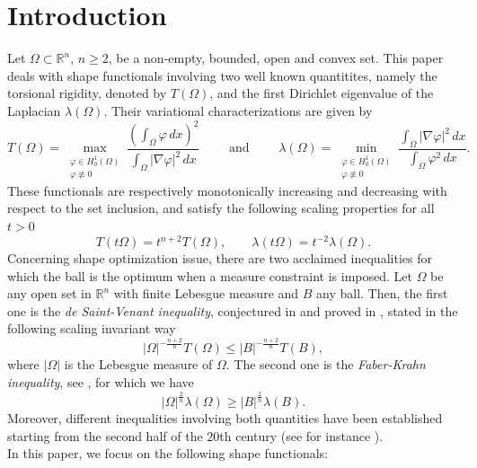 \documentclass[oneside,a4paper,11pt,notitlepage]{article}
\newcommand{\abs}[1]{{\left|#1\right|}}
\theoremstyle{definition}
\theoremstyle{plain}
\theoremstyle{definition}
\begin{document}
\section{Introduction}
Let $\Omega\subset\mathbb{R}^n$, $n\geq 2$, be a non-empty, bounded, open and convex set. This paper deals with shape functionals involving two well known quantitites, namely the torsional rigidity, denoted by $T(\Omega)$, and the first Dirichlet eigenvalue of the Laplacian $\lambda(\Omega)$. Their variational characterizations are given by
$$
T(\Omega) = \max_{\substack{\varphi \in H^1_0(\Omega) \\ \varphi \not\equiv 0}} \frac{\left(\displaystyle{\int_\Omega \varphi \, dx }\right)^2}{\displaystyle{\int_\Omega \abs{\nabla \varphi}^2 \, dx }} \qquad \text{ and }\qquad\lambda(\Omega)= \min_{\substack{\varphi \in H^1_0(\Omega) \\ \varphi \not\equiv 0}} \frac{\displaystyle{\int_\Omega  \abs{\nabla \varphi}^2 \, dx }}{\displaystyle{\int_\Omega  \varphi^2 \, dx }} .
$$
These functionals are respectively monotonically increasing and decreasing with respect to the set inclusion, and satisfy the following scaling properties for all $t>0$
\begin{equation*}
T(t\Omega)= t^{n+2}T(\Omega),\qquad \lambda(t\Omega)= t^{-2}\lambda(\Omega).
\end{equation*}
Concerning shape optimization issue, there are two acclaimed inequalities for which the ball is the optimum when a measure constraint is imposed. Let $\Omega$ be any open set in $\mathbb R^n$ with finite Lebesgue measure and $B$ any ball. Then, the first one is the \textit{de Saint-Venant inequality}, conjectured in \cite{stvenant} and proved in \cite{PTR48}, stated in the following scaling invariant way
\begin{equation*}
    \abs{\Omega}^{-\frac{n+2}{n}}T(\Omega) \le \abs{B}^{-\frac{n+2}{n}}T(B),
\end{equation*}
where $\abs{\Omega}$ is the Lebesgue measure of $\Omega$. The second one is the \textit{Faber-Krahn inequality}, see  \cite{Faber1923,Krahn1925}, for which we have
\begin{equation*}
    \abs{\Omega}^\frac{2}{n}\lambda(\Omega) \ge \abs{B}^\frac{2}{n}\lambda(B). 
\end{equation*}
Moreover, different inequalities involving  both quantities have been established starting from the second half of the $20$th century (see for instance \cite{KJ1,KJ2,PS}).\\
In this paper, we focus on the following shape functionals:
\end{document}
